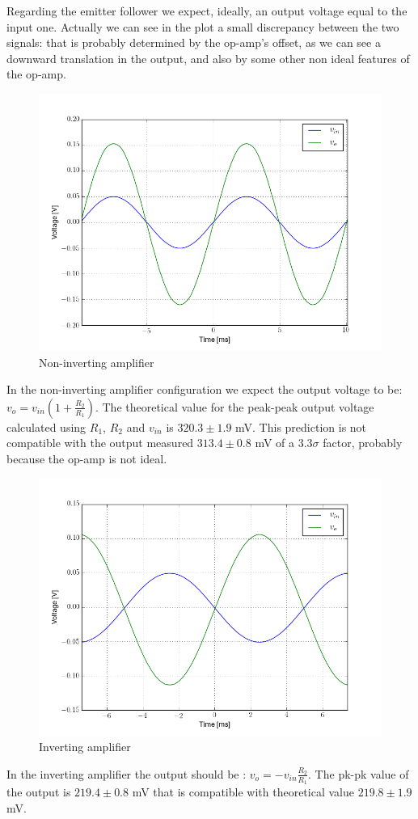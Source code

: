 Regarding the emitter follower we expect, ideally, an output voltage equal to the input one. Actually we can see in the plot a small discrepancy between the two signals: that is probably determined by the op-amp's offset, as we can see a downward translation in the output, and also by some other non ideal features of the op-amp.
\begin{figure}[H]
\centering
\includegraphics[width=.7\textwidth]{1/scope3.png}
\caption{Non-inverting amplifier}
\end{figure}
In the non-inverting amplifier configuration we expect the output voltage to be: $v_o = v_{in} (1 + \frac{R_2}{R_1})$. The theoretical value for the  peak-peak output voltage calculated using $R_1$, $R_2$ and $v_{in}$ is $320.3\pm 1.9$ mV. This prediction is not compatible with the output measured $313.4\pm 0.8$ mV of a $3.3 \sigma$ factor, probably because the op-amp is not ideal.
\begin{figure}[H]
\centering
\includegraphics[width=.7\textwidth]{1/scope4.png}
\caption{Inverting amplifier}
\end{figure}
In the inverting amplifier the output should be : $v_o = - v_{in} \frac{R_2}{R_1}$. The pk-pk value of the output is $219.4\pm 0.8$ mV that is compatible with theoretical value $219.8\pm 1.9$ mV.
